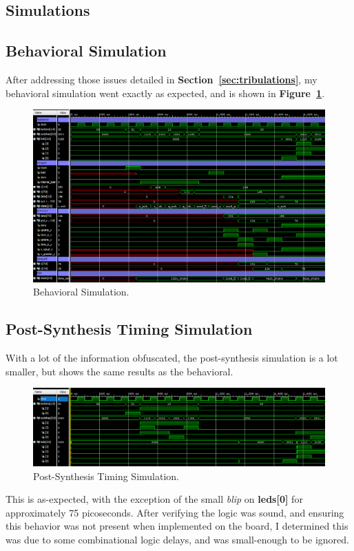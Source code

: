 \documentclass[a4paper, 12pt]{article}
\begin{document}
\begin{landscape}
\section{Simulations}
\subsection{Behavioral Simulation}
After addressing those issues detailed in \textbf{Section~\ref{sec:tribulations}}, my behavioral simulation went exactly as expected, and is shown in \textbf{Figure~\ref{fig:behav-sim}}.

\begin{figure}[H]
\centering
\includegraphics[width=0.65\paperheight, keepaspectratio=true]{Sources/Behav-Sim.PNG}
\caption{Behavioral Simulation.}
\label{fig:behav-sim}
\end{figure}

\subsection{Post-Synthesis Timing Simulation}
With a lot of the information obfuscated, the post-synthesis simulation is a lot smaller, but shows the same results as the behavioral. 

\begin{figure}[H]
\centering
\includegraphics[width=0.80\paperheight, keepaspectratio=true]{Sources/Post-Synth-Timing-sim.PNG}
\caption{Post-Synthesis Timing Simulation.}
\label{fig:post-synth-sim}
\end{figure}

This is as-expected, with the exception of the small \textit{blip} on \textbf{leds[0]} for approximately 75 picoseconds. After verifying the logic was sound, and ensuring this behavior was not present when implemented on the board, I determined this was due to some combinational logic delays, and was small-enough to be ignored.
\end{landscape}
\end{document}
